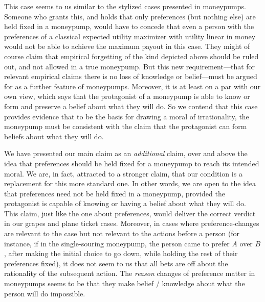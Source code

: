 \documentclass[11pt]{article}
\theoremstyle{definition}
\theoremstyle{definition}
\begin{document}

This case seems to us similar to the stylized cases presented in moneypumps. Someone who grants this, and holds that only preferences (but nothing else) are held fixed in a moneypump, would have to concede that even a person with the preferences of a classical expected utility maximizer with utility linear in money would not be able to achieve the maximum payout in this case. They might of course claim that empirical forgetting of the kind depicted above should be ruled out, and not allowed in a true moneypump. But this new requirement---that for relevant empirical claims there is no loss of knowledge or belief---must be argued for as a further feature of moneypumps. Moreover, it is at least on a par with our own view, which says that the protagonist of a moneypump is able to know or form and preserve a belief about what  they will do. So we contend that this case provides evidence that to be the basis for drawing a moral of irrationality, the moneypump must be consistent with the claim that the protagonist can form beliefs about what they will do.

We have presented our main claim as an \emph{additional} claim, over and above the idea that preferences should be held fixed for a moneypump to reach its intended moral. We are, in fact, attracted to a stronger claim, that our condition is a replacement for this more standard one. In other words, we are open to the idea that preferences need not be held fixed in a moneypump, provided the protagonist is capable of knowing or having a belief about what they will do. This claim, just like the one about preferences, would deliver the correct verdict in our grapes and plane ticket cases. Moreover, in cases where preference-changes are relevant to the case but not relevant to the actions before a person (for instance, if in the single-souring moneypump, the person came to prefer $A$ over $B$, after making the initial choice to go down, while holding the rest of their preferences fixed), it does not seem to us that all bets are off about the rationality of the subsequent action. The \emph{reason} changes of preference matter in moneypumps seems to be that they make belief / knowledge about what the person will do impossible.
\end{document}
